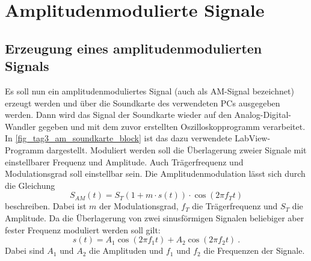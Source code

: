 \documentclass[
a4paper,
12pt,
pagesize,
ngerman
]{scrartcl}
\begin{document}
	\section{Amplitudenmodulierte Signale}

	\subsection{Erzeugung eines amplitudenmodulierten Signals} \label{AMSignalErzeugung}
	
	Es soll nun ein amplitudenmoduliertes Signal (auch als AM-Signal bezeichnet) erzeugt werden und über die Soundkarte des verwendeten PCs ausgegeben werden.
	Dann wird das Signal der Soundkarte wieder auf den Analog-Digital-Wandler gegeben und mit dem zuvor erstellten Oszilloskopprogramm verarbeitet.
	In \cref{fig_tag3_am_soundkarte_block} ist das dazu verwendete LabView-Programm dargestellt.
	Moduliert werden soll die Überlagerung zweier Signale mit einstellbarer Frequenz und Amplitude.
	Auch Trägerfrequenz und Modulationsgrad soll einstellbar sein.
	Die Amplitudenmodulation lässt sich durch die Gleichung
	\begin{equation} \label{AMFormel}
		S_{AM}(t)=S_T (1+m \cdot s(t)) \cdot \cos(2\pi f_T t)
	\end{equation}
	beschreiben.
	Dabei ist $m$ der Modulationsgrad, $f_T$ die Trägerfrequenz und $S_T$ die Amplitude.
	Da die Überlagerung von zwei sinusförmigen Signalen beliebiger aber fester Frequenz moduliert werden soll gilt:
	\begin{equation} \label{Ursprungssignal}
		s(t) = A_1 \cos (2\pi f_1 t) + A_2 \cos (2\pi f_2 t) \ . 
	\end{equation}
	Dabei sind $A_1$ und $A_2$ die Amplituden und $f_1$ und $f_2$ die Frequenzen der Signale.
	
\end{document}
